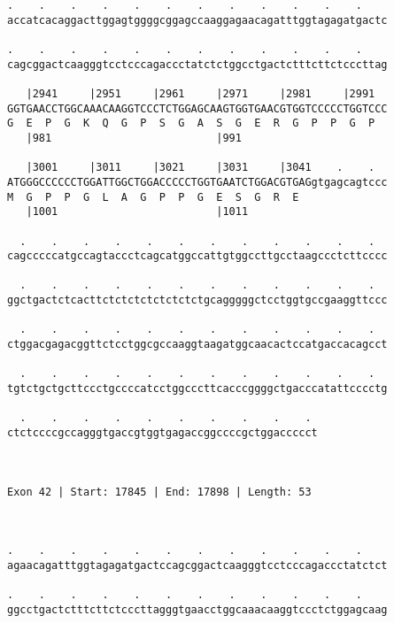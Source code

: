 \documentclass{article}
\begin{document}
\begin{Verbatim}
.    .    .    .    .    .    .    .    .    .    .    .    
accatcacaggacttggagtggggcggagccaaggagaacagatttggtagagatgactc
                                                            
.    .    .    .    .    .    .    .    .    .    .    .    
cagcggactcaagggtcctcccagaccctatctctggcctgactctttcttctcccttag
                                                            
   |2941     |2951     |2961     |2971     |2981     |2991  
GGTGAACCTGGCAAACAAGGTCCCTCTGGAGCAAGTGGTGAACGTGGTCCCCCTGGTCCC
G  E  P  G  K  Q  G  P  S  G  A  S  G  E  R  G  P  P  G  P  
   |981                          |991                       
  
   |3001     |3011     |3021     |3031     |3041    .    .  
ATGGGCCCCCCTGGATTGGCTGGACCCCCTGGTGAATCTGGACGTGAGgtgagcagtccc
M  G  P  P  G  L  A  G  P  P  G  E  S  G  R  E              
   |1001                         |1011                      
  
  .    .    .    .    .    .    .    .    .    .    .    .  
cagcccccatgccagtaccctcagcatggccattgtggccttgcctaagccctcttcccc
                                                            
  .    .    .    .    .    .    .    .    .    .    .    .  
ggctgactctcacttctctctctctctctctgcagggggctcctggtgccgaaggttccc
                                                            
  .    .    .    .    .    .    .    .    .    .    .    .  
ctggacgagacggttctcctggcgccaaggtaagatggcaacactccatgaccacagcct
                                                            
  .    .    .    .    .    .    .    .    .    .    .    .  
tgtctgctgcttccctgccccatcctggcccttcacccggggctgacccatattcccctg
                                                            
  .    .    .    .    .    .    .    .    .    . 
ctctccccgccagggtgaccgtggtgagaccggccccgctggaccccct
                                                 
                                                 
 
Exon 42 | Start: 17845 | End: 17898 | Length: 53



.    .    .    .    .    .    .    .    .    .    .    .    
agaacagatttggtagagatgactccagcggactcaagggtcctcccagaccctatctct
                                                            
.    .    .    .    .    .    .    .    .    .    .    .    
ggcctgactctttcttctcccttagggtgaacctggcaaacaaggtccctctggagcaag
                                                            

\end{Verbatim}
\end{document}
